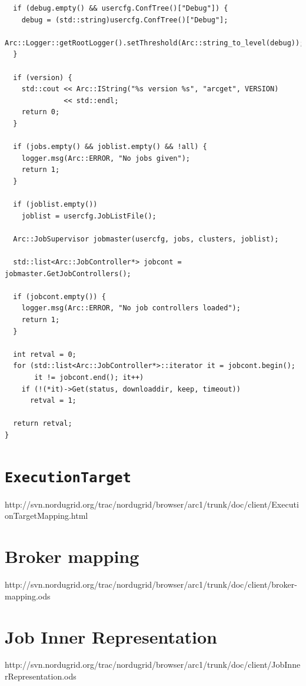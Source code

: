 \documentclass{book}
\newcommand{\ExecutionTarget}{\texttt{ExecutionTarget}}
\begin{document}
\begin{shaded}
\begin{verbatim}
  if (debug.empty() && usercfg.ConfTree()["Debug"]) {
    debug = (std::string)usercfg.ConfTree()["Debug"];
    Arc::Logger::getRootLogger().setThreshold(Arc::string_to_level(debug));
  }

  if (version) {
    std::cout << Arc::IString("%s version %s", "arcget", VERSION)
              << std::endl;
    return 0;
  }

  if (jobs.empty() && joblist.empty() && !all) {
    logger.msg(Arc::ERROR, "No jobs given");
    return 1;
  }

  if (joblist.empty())
    joblist = usercfg.JobListFile();

  Arc::JobSupervisor jobmaster(usercfg, jobs, clusters, joblist);

  std::list<Arc::JobController*> jobcont = jobmaster.GetJobControllers();

  if (jobcont.empty()) {
    logger.msg(Arc::ERROR, "No job controllers loaded");
    return 1;
  }

  int retval = 0;
  for (std::list<Arc::JobController*>::iterator it = jobcont.begin();
       it != jobcont.end(); it++)
    if (!(*it)->Get(status, downloaddir, keep, timeout))
      retval = 1;

  return retval;
}
\end{verbatim}
\end{shaded}

\appendix

\chapter{{\ExecutionTarget}}
\label{app:ExTarget}

http://svn.nordugrid.org/trac/nordugrid/browser/arc1/trunk/doc/client/ExecutionTargetMapping.html

\chapter{Broker mapping}
\label{app:broker-mapping}

http://svn.nordugrid.org/trac/nordugrid/browser/arc1/trunk/doc/client/broker-mapping.ods

\chapter{Job Inner Representation}
\label{app:jobinnerrepresentation}

http://svn.nordugrid.org/trac/nordugrid/browser/arc1/trunk/doc/client/JobInnerRepresentation.ods


\end{document}
